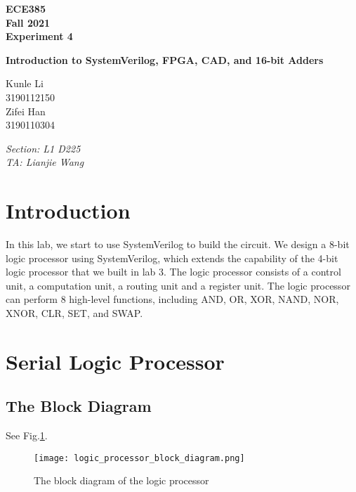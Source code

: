 \documentclass[11pt]{article}
\begin{document}
\begin{titlepage}
    \centering
    {\Huge\bfseries ECE385\\\Large Fall 2021\\\Large Experiment 4}

    \vspace{1cm}
    
    {\LARGE\bfseries Introduction to SystemVerilog, FPGA, CAD, and 16-bit Adders}
    
    \vspace{2cm}
    
    {\Large Kunle Li\\3190112150\\Zifei Han\\3190110304}
    
    \vfill
    
    {\large\itshape Section: L1 D225\\TA: Lianjie Wang}
    \end{titlepage}

\tableofcontents
\section{Introduction}
In this lab, we start to use SystemVerilog to build the circuit. We design a 8-bit logic processor using SystemVerilog, which extends the capability of the 4-bit logic processor that we built in lab 3. The logic processor consists of a control unit, a computation unit, a routing unit and a register unit. The logic processor can perform 8 high-level functions, including AND, OR, XOR, NAND, NOR, XNOR, CLR, SET, and SWAP.

\section{Serial Logic Processor}
\subsection{The Block Diagram}
See Fig.\ref{logic}.
\begin{figure}[h]
    \centering
    \texttt{[image: logic\_processor\_block\_diagram.png]}
    \caption{The block diagram of the logic processor}
    \label{logic}
\end{figure}
\end{document}
